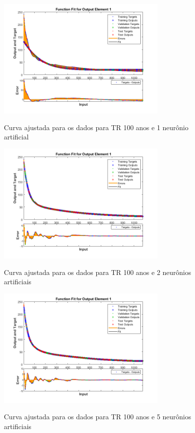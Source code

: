 \begin{figure}[H]
    \caption{Curva ajustada para os dados para TR 100 anos e 1 neurônio artificial}
    \centering
    \includegraphics[width=0.74\textwidth]{Textuais/Figuras/NN/tr100-1neuronio.png}
    \label{fig:tr100-1n}
\end{figure}

\begin{figure}[H]
    \caption{Curva ajustada para os dados para TR 100 anos e 2 neurônios artificiais}
    \centering
    \includegraphics[width=0.74\textwidth]{Textuais/Figuras/NN/tr100-2neuronio.png}
    \label{fig:tr100-2n}
\end{figure}

\begin{figure}[H]
    \caption{Curva ajustada para os dados para TR 100 anos e 5 neurônios artificiais}
    \centering
    \includegraphics[width=0.74\textwidth]{Textuais/Figuras/NN/tr100-5neuronio.png}
    \label{fig:tr100-5n}
\end{figure}

